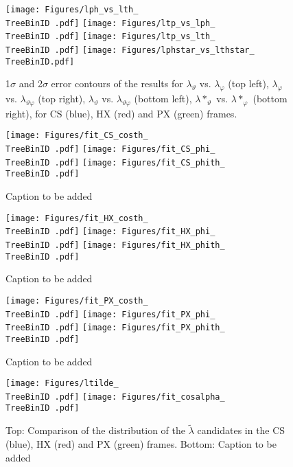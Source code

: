 \documentclass[12pt]{article}
\newcommand{\lamth}{\lambda_\vartheta}
\newcommand{\lamph}{\lambda_\varphi}
\newcommand{\lamthph}{\lambda_{\vartheta\varphi}}
\newcommand{\lamtilde}{\tilde{\lambda}}
\newcommand{\lamthstar}{\lambda*_\vartheta}
\newcommand{\lamphstar}{\lambda*_\varphi}
\providecommand{\TreeBinID}[1]{TreeBinIDDefault_rap1pt1}%
\begin{document}




\begin{figure}[htbp]
\centering
\texttt{[image: Figures/lph\_vs\_lth\_\\TreeBinID .pdf]}
\texttt{[image: Figures/ltp\_vs\_lph\_\\TreeBinID .pdf]}
\texttt{[image: Figures/ltp\_vs\_lth\_\\TreeBinID .pdf]}
\texttt{[image: Figures/lphstar\_vs\_lthstar\_\\TreeBinID.pdf]}
\caption{1$\sigma$ and 2$\sigma$ error contours of the results for $\lamth$
vs. $\lamph$ (top left), $\lamph$ vs. $\lamthph$ (top right), $\lamth$ vs.
$\lamthph$ (bottom left), $\lamthstar$ vs. $\lamphstar$ (bottom right), for CS
(blue), HX (red) and PX (green) frames.}
\end{figure}
\clearpage




\begin{figure}[htbp]
\centering
\texttt{[image: Figures/fit\_CS\_costh\_\\TreeBinID .pdf]}
\texttt{[image: Figures/fit\_CS\_phi\_\\TreeBinID .pdf]}
\texttt{[image: Figures/fit\_CS\_phith\_\\TreeBinID .pdf]}
\caption{Caption to be added}
\end{figure}
\clearpage

\begin{figure}[htbp]
\centering
\texttt{[image: Figures/fit\_HX\_costh\_\\TreeBinID .pdf]}
\texttt{[image: Figures/fit\_HX\_phi\_\\TreeBinID .pdf]}
\texttt{[image: Figures/fit\_HX\_phith\_\\TreeBinID .pdf]}
\caption{Caption to be added}
\end{figure}
\clearpage

\begin{figure}[htbp]
\centering
\texttt{[image: Figures/fit\_PX\_costh\_\\TreeBinID .pdf]}
\texttt{[image: Figures/fit\_PX\_phi\_\\TreeBinID .pdf]}
\texttt{[image: Figures/fit\_PX\_phith\_\\TreeBinID .pdf]}
\caption{Caption to be added}
\end{figure}
\clearpage

\begin{figure}[htbp]
\centering
\texttt{[image: Figures/ltilde\_\\TreeBinID .pdf]}
\texttt{[image: Figures/fit\_cosalpha\_\\TreeBinID .pdf]}
\caption{Top: Comparison of the distribution of the $\lamtilde$ candidates in
the CS (blue), HX (red) and PX (green) frames. Bottom: Caption to be added}
\end{figure}
\clearpage
\end{document}
